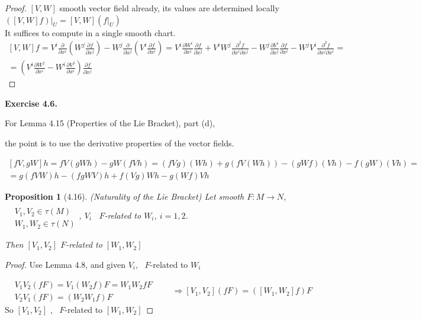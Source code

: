 \documentclass[11pt]{amsart}
\newtheorem{proposition}{Proposition}
\theoremstyle{definition}
\newcommand{\exercisehead}[1]{\medskip\noindent\textbf{Exercise #1.} }
\begin{document}
\begin{proof}
  $[V,W]$ smooth vector field already, its values are determined locally $\left. ([V,W] f ) \right|_U = [V,W] ( \left. f \right|_U )$  \\
It suffices to compute in a single smooth chart.
\[
\begin{gathered}
[V,W] f = V^i \frac{ \partial }{ \partial x^i } \left( W^j \frac{ \partial f}{ \partial x^j} \right) - W^j \frac{ \partial }{ \partial x^j} \left( V^i \frac{ \partial f}{ \partial x^i }\right) = V^i \frac{ \partial W^i}{ \partial x^i } \frac{ \partial f}{ \partial x^j} + V^i W^j \frac{ \partial^2 f}{ \partial x^i \partial x^j } - W^j \frac{ \partial V^i }{ \partial x^j} \frac{ \partial f}{ \partial x^i } - W^j V^i \frac{ \partial^2 f}{ \partial x^j  \partial x^i } = \\
= \left( V^i \frac{ \partial W^j}{ \partial x^i } - W^i \frac{ \partial V^j}{ \partial x^i} \right) \frac{ \partial f}{ \partial x^j}
\end{gathered}
\]

\end{proof}

\exercisehead{4.6}

For Lemma 4.15 (Properties of the Lie Bracket), part (d),

the point is to use the derivative properties of the vector fields.

\[
\begin{gathered}
  \left[fV, gW \right] h = fV( gW h ) - gW (fVh) = (fVg)(Wh) + g(fV(Wh)) - (gWf)(Vh) - f(gW)(Vh) = \\
  = g( f VW) h - (fgWV)h +   f(Vg)W h - g(Wf)Vh
\end{gathered}
\]

\begin{proposition}[4.16] (Naturality of the Lie Bracket)
  Let smooth $F:M \to N$, \quad $\begin{aligned} & \quad \\ & V_1, V_2 \in \tau(M) \\ & W_1, W_2 \in \tau(N) \end{aligned}$, \quad $V_i$ \, $F$-related to $W_i$, $i=1,2$.

Then $[V_1, V_2 ]$ $F$-related to $[W_1, W_2]$

\end{proposition}

\begin{proof}
Use Lemma 4.8, and given $V_i$, \, $F$-related to $W_i$

\[
\begin{aligned}
  & V_1 V_2 (fF) = V_1 (W_2 f) F = W_1 W_2 fF \\
  & V_2 V_1 (fF) = (W_2 W_1 f) F
\end{aligned} \quad \quad \Longrightarrow [V_1, V_2](fF) = ( [W_1, W_2] f)F
\]
So $[V_1, V_2]$ , \, $F$-related to $[W_1, W_2]$
\end{proof}
\end{document}
